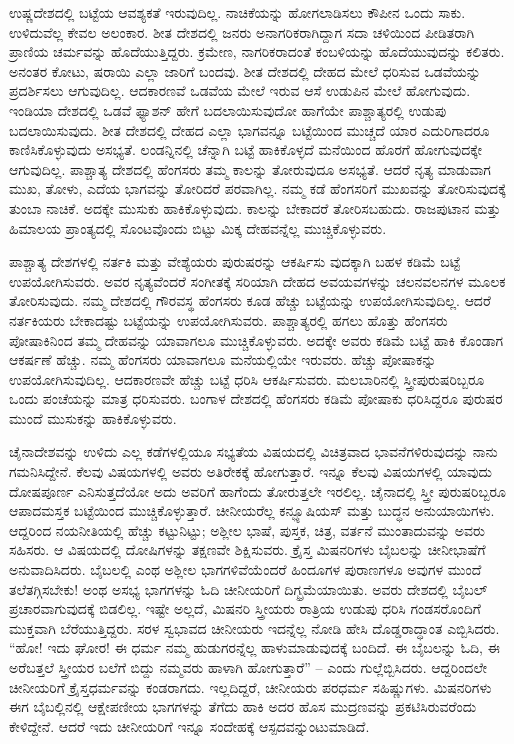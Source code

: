 ಉಷ್ಣದೇಶದಲ್ಲಿ ಬಟ್ಟೆಯ ಆವಶ್ಯಕತೆ ಇರುವುದಿಲ್ಲ. ನಾಚಿಕೆಯನ್ನು ಹೋಗಲಾಡಿಸಲು ಕೌಪೀನ ಒಂದು ಸಾಕು. ಉಳಿದುವೆಲ್ಲ ಕೇವಲ ಅಲಂಕಾರ. ಶೀತ ದೇಶದಲ್ಲಿ ಜನರು ಅನಾಗರಿಕರಾಗಿದ್ದಾಗ ಸದಾ ಚಳಿಯಿಂದ ಪೀಡಿತರಾಗಿ ಪ್ರಾಣಿಯ ಚರ್ಮವನ್ನು ಹೊದೆಯು\break ತ್ತಿದ್ದರು. ಕ್ರಮೇಣ, ನಾಗರಿಕರಾದಂತೆ ಕಂಬಳಿಯನ್ನು ಹೊದೆಯುವುದನ್ನು ಕಲಿತರು. ಅನಂತರ ಕೋಟು, ಷರಾಯಿ ಎಲ್ಲಾ ಜಾರಿಗೆ ಬಂದವು. ಶೀತ ದೇಶದಲ್ಲಿ ದೇಹದ ಮೇಲೆ ಧರಿಸುವ ಒಡವೆಯನ್ನು ಪ್ರದರ್ಶಿಸಲು ಆಗುವುದಿಲ್ಲ. ಆದಕಾರಣವೆ ಒಡವೆಯ ಮೇಲೆ ಇರುವ ಆಸೆ ಉಡುಪಿನ ಮೇಲೆ ಹೋಗುವುದು. ಇಂಡಿಯಾ ದೇಶದಲ್ಲಿ ಒಡವೆ ಫ್ಯಾಶನ್​ ಹೇಗೆ ಬದಲಾಯಿಸುವುದೋ ಹಾಗೆಯೇ ಪಾಶ್ಚಾತ್ಯರಲ್ಲಿ ಉಡುಪು ಬದಲಾಯಿಸುವುದು. ಶೀತ ದೇಶದಲ್ಲಿ ದೇಹದ ಎಲ್ಲಾ ಭಾಗವನ್ನೂ ಬಟ್ಟೆಯಿಂದ ಮುಚ್ಚದೆ ಯಾರ ಎದುರಿಗಾದರೂ ಕಾಣಿಸಿಕೊಳ್ಳುವುದು ಅಸಭ್ಯತೆ. ಲಂಡನ್ನಿನಲ್ಲಿ ಚೆನ್ನಾಗಿ ಬಟ್ಟೆ ಹಾಕಿಕೊಳ್ಳದೆ ಮನೆಯಿಂದ ಹೊರಗೆ ಹೋಗುವುದಕ್ಕೇ ಆಗುವುದಿಲ್ಲ. ಪಾಶ್ಚಾತ್ಯ ದೇಶದಲ್ಲಿ ಹೆಂಗಸರು ತಮ್ಮ ಕಾಲನ್ನು ತೋರು\break ವುದೂ ಅಸಭ್ಯತೆ. ಆದರೆ ನೃತ್ಯ ಮಾಡುವಾಗ ಮುಖ, ತೋಳು, ಎದೆಯ ಭಾಗವನ್ನು ತೋರಿದರೆ ಪರವಾಗಿಲ್ಲ. ನಮ್ಮ ಕಡೆ ಹೆಂಗಸರಿಗೆ ಮುಖವನ್ನು ತೋರಿಸುವುದಕ್ಕೆ ತುಂಬಾ ನಾಚಿಕೆ. ಅದಕ್ಕೇ ಮುಸುಕು ಹಾಕಿಕೊಳ್ಳುವುದು. ಕಾಲನ್ನು ಬೇಕಾದರೆ ತೋರಿಸಬಹುದು. ರಾಜಪುಟಾನ ಮತ್ತು ಹಿಮಾಲಯ ಪ್ರಾಂತ್ಯದಲ್ಲಿ ಸೊಂಟವೊಂದು ಬಿಟ್ಟು ಮಿಕ್ಕ ದೇಹ\break ವನ್ನೆಲ್ಲ ಮುಚ್ಚಿಕೊಳ್ಳುವರು.

ಪಾಶ್ಚಾತ್ಯ ದೇಶಗಳಲ್ಲಿ ನರ್ತಕಿ ಮತ್ತು ವೇಶ್ಯೆಯರು ಪುರುಷರನ್ನು ಆಕರ್ಷಿಸು ವುದಕ್ಕಾಗಿ ಬಹಳ ಕಡಿಮೆ ಬಟ್ಟೆ ಉಪಯೋಗಿಸುವರು. ಅವರ ನೃತ್ಯವೆಂದರೆ ಸಂಗೀತಕ್ಕೆ ಸರಿಯಾಗಿ ದೇಹದ ಅವಯವಗಳನ್ನು ಚಲನವಲನಗಳ ಮೂಲಕ ತೋರಿಸುವುದು. ನಮ್ಮ ದೇಶದಲ್ಲಿ ಗೌರವಸ್ಥ ಹೆಂಗಸರು ಕೂಡ ಹೆಚ್ಚು ಬಟ್ಟೆಯನ್ನು ಉಪಯೋಗಿಸುವುದಿಲ್ಲ. ಆದರೆ ನರ್ತಕಿಯರು ಬೇಕಾದಷ್ಟು ಬಟ್ಟೆಯನ್ನು ಉಪಯೋಗಿಸುವರು. ಪಾಶ್ಚಾತ್ಯರಲ್ಲಿ ಹಗಲು ಹೊತ್ತು ಹೆಂಗಸರು ಪೋಷಾಕಿನಿಂದ ತಮ್ಮ ದೇಹವನ್ನು ಯಾವಾಗಲೂ ಮುಚ್ಚಿಕೊಳ್ಳುವರು. ಅದಕ್ಕೇ ಅವರು ಕಡಿಮೆ ಬಟ್ಟೆ ಹಾಕಿ ಕೊಂಡಾಗ ಆಕರ್ಷಣೆ ಹೆಚ್ಚು. ನಮ್ಮ ಹೆಂಗಸರು ಯಾವಾಗಲೂ ಮನೆಯಲ್ಲಿಯೇ ಇರುವರು. ಹೆಚ್ಚು ಪೋಷಾಕನ್ನು ಉಪಯೋಗಿಸುವುದಿಲ್ಲ. ಆದಕಾರಣವೇ ಹೆಚ್ಚು ಬಟ್ಟೆ ಧರಿಸಿ ಆಕರ್ಷಿಸುವರು. ಮಲಬಾರಿನಲ್ಲಿ ಸ್ತ್ರೀಪುರುಷರಿಬ್ಬರೂ ಒಂದು ಪಂಚೆಯನ್ನು ಮಾತ್ರ ಧರಿಸುವರು. ಬಂಗಾಳ ದೇಶದಲ್ಲಿ ಹೆಂಗಸರು ಕಡಿಮೆ ಪೋಷಾಕು ಧರಿಸಿದ್ದರೂ ಪುರುಷರ ಮುಂದೆ ಮುಸುಕನ್ನು ಹಾಕಿಕೊಳ್ಳುವರು.

ಚೈನಾದೇಶವನ್ನು ಉಳಿದು ಎಲ್ಲ ಕಡೆಗಳಲ್ಲಿಯೂ ಸಭ್ಯತೆಯ ವಿಷಯದಲ್ಲಿ ವಿಚಿತ್ರವಾದ ಭಾವನೆಗಳಿರುವುದನ್ನು ನಾನು ಗಮನಿಸಿದ್ದೇನೆ. ಕೆಲವು ವಿಷಯಗಳಲ್ಲಿ ಅವರು ಅತಿರೇಕಕ್ಕೆ ಹೋಗುತ್ತಾರೆ. ಇನ್ನೂ ಕೆಲವು ವಿಷಯಗಳಲ್ಲಿ ಯಾವುದು ದೋಷಪೂರ್ಣ ಎನಿಸುತ್ತದೆಯೋ ಅದು ಅವರಿಗೆ ಹಾಗೆಂದು ತೋರುತ್ತಲೇ ಇರಲಿಲ್ಲ. ಚೈನಾದಲ್ಲಿ ಸ್ತ್ರೀ ಪುರುಷರಿಬ್ಬರೂ ಆಪಾದಮಸ್ತಕ ಬಟ್ಟೆಯಿಂದ ಮುಚ್ಚಿಕೊಳ್ಳುತ್ತಾರೆ. ಚೀನೀಯರೆಲ್ಲ ಕನ್ಫ್ಯೂಷಿ\break ಯಸ್​ ಮತ್ತು ಬುದ್ಧನ ಅನುಯಾಯಿಗಳು. ಆದ್ದರಿಂದ ನಯನೀತಿಯಲ್ಲಿ ಹೆಚ್ಚು ಕಟ್ಟುನಿಟ್ಟು; ಅಶ್ಲೀಲ ಭಾಷೆ, ಪುಸ್ತಕ, ಚಿತ್ರ, ವರ್ತನೆ ಮುಂತಾದುವನ್ನು ಅವರು ಸಹಿಸರು. ಆ ವಿಷಯದಲ್ಲಿ ದೋಷಿಗಳನ್ನು ತಕ್ಷಣವೇ ಶಿಕ್ಷಿಸುವರು. ಕ್ರೈಸ್ತ ಮಿಷನರಿಗಳು ಬೈಬಲನ್ನು ಚೀನೀಭಾಷೆಗೆ ಅನುವಾದಿಸಿದರು. ಬೈಬಲಲ್ಲಿ ಎಂಥ ಅಶ್ಲೀಲ ಭಾಗಗಳಿವೆಯೆಂದರೆ ಹಿಂದೂ\break ಗಳ ಪುರಾಣಗಳೂ ಅವುಗಳ ಮುಂದೆ ತಲೆತಗ್ಗಿಸಬೇಕು! ಅಂಥ ಅಸಭ್ಯ ಭಾಗಗಳನ್ನು ಓದಿ ಚೀನೀಯರಿಗೆ ದಿಗ್ಭ್ರಮೆಯಾಯಿತು. ಅವರು ದೇಶದಲ್ಲಿ ಬೈಬಲ್​ ಪ್ರಚಾರವಾಗುವುದಕ್ಕೆ ಬಿಡಲಿಲ್ಲ. ಇಷ್ಟೇ ಅಲ್ಲದೆ, ಮಿಷನರಿ ಸ್ತ್ರೀಯರು ರಾತ್ರಿಯ ಉಡುಪು ಧರಿಸಿ ಗಂಡಸರೊಂದಿಗೆ ಮುಕ್ತವಾಗಿ ಬೆರೆಯುತ್ತಿದ್ದರು. ಸರಳ ಸ್ವಭಾವದ ಚೀನೀಯರು ಇದನ್ನೆಲ್ಲ ನೋಡಿ ಹೇಸಿ ದೊಡ್ಡರಾದ್ಧಾಂತ ಎಬ್ಬಿಸಿದರು. “ಹೋ! ಇದು ಘೋರ! ಈ ಧರ್ಮ ನಮ್ಮ ಹುಡುಗರನ್ನೆಲ್ಲ ಹಾಳುಮಾಡುವುದಕ್ಕೆ ಬಂದಿದೆ. ಈ ಬೈಬಲನ್ನು ಓದಿ, ಈ ಅರೆಬತ್ತಲೆ ಸ್ತ್ರೀಯರ ಬಲೆಗೆ ಬಿದ್ದು ನಮ್ಮವರು ಹಾಳಾಗಿ ಹೋಗುತ್ತಾರೆ” – ಎಂದು ಗುಲ್ಲೆಬ್ಬಿಸಿದರು. ಆದ್ದರಿಂದಲೇ ಚೀನೀಯರಿಗೆ ಕ್ರೈಸ್ತಧರ್ಮವನ್ನು ಕಂಡರಾಗದು. ಇಲ್ಲದಿದ್ದರೆ, ಚೀನೀಯರು ಪರಧರ್ಮ ಸಹಿಷ್ಣುಗಳು. ಮಿಷನರಿಗಳು ಈಗ ಬೈಬಲ್ಲಿನಲ್ಲಿ ಆಕ್ಷೇಪಣೀಯ ಭಾಗಗಳನ್ನು ತೆಗೆದು ಹಾಕಿ ಅದರ ಹೊಸ ಮುದ್ರಣವನ್ನು ಪ್ರಕಟಿಸಿರುವರೆಂದು ಕೇಳಿದ್ದೇನೆ. ಆದರೆ ಇದು ಚೀನೀಯರಿಗೆ ಇನ್ನೂ ಸಂದೇಹಕ್ಕೆ ಆಸ್ಪದವನ್ನುಂಟುಮಾಡಿದೆ.

